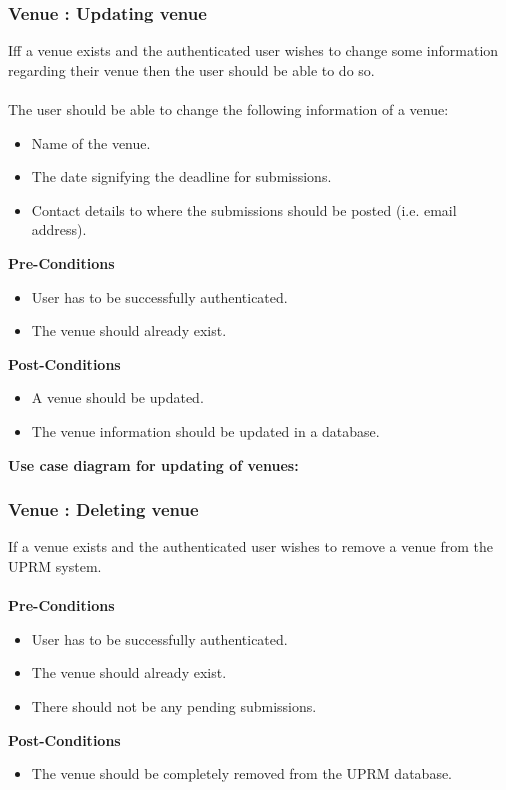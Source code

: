 \subsubsection{Venue : Updating venue}
Iff a venue exists and the authenticated user wishes to change some information regarding their venue then the user should be able to do so. \\ \\
The user should be able to change the following information of a venue: 
\begin{itemize}
	\item Name of the venue.
	\item The date signifying the deadline for submissions.
	\item Contact details to where the submissions should be posted (i.e. email address).\\
\end{itemize}
\textbf{Pre-Conditions}
\begin{itemize}
	\item User has to be successfully authenticated.
	\item The venue should already exist.\\
\end{itemize}
\textbf{Post-Conditions}
\begin{itemize}
	\item A venue should be updated.
	\item The venue information should be updated in a database.\\
\end{itemize}
\textbf{Use case diagram for updating of venues: }\\
\centerline{}

\subsubsection{Venue : Deleting venue}
If a venue exists and the authenticated user wishes to remove a venue from the UPRM system. \\ \\
\textbf{Pre-Conditions}
\begin{itemize}
	\item User has to be successfully authenticated.
	\item The venue should already exist.
	\item There should not be any pending submissions.\\
\end{itemize}
\textbf{Post-Conditions}
\begin{itemize}
	\item The venue should be completely removed from the UPRM database.\\
\end{itemize}

